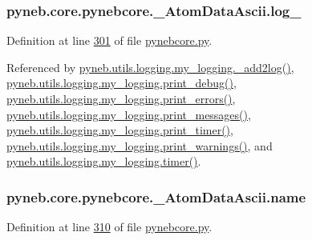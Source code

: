 \hypertarget{classpyneb_1_1core_1_1pynebcore_1_1___atom_data_ascii_aaddba4bcc59a7a5e69c08b2545939737}{}
\subsubsection[{log\+\_\+}]{\setlength{\rightskip}{0pt plus 5cm}pyneb.\+core.\+pynebcore.\+\_\+\+Atom\+Data\+Ascii.\+log\+\_\+}\label{classpyneb_1_1core_1_1pynebcore_1_1___atom_data_ascii_aaddba4bcc59a7a5e69c08b2545939737}


Definition at line \hyperlink{pynebcore_8py_source_l00301}{301} of file \hyperlink{pynebcore_8py_source}{pynebcore.\+py}.



Referenced by \hyperlink{logging_8py_source_l00059}{pyneb.\+utils.\+logging.\+my\+\_\+logging.\+\_\+add2log()}, \hyperlink{logging_8py_source_l00157}{pyneb.\+utils.\+logging.\+my\+\_\+logging.\+print\+\_\+debug()}, \hyperlink{logging_8py_source_l00149}{pyneb.\+utils.\+logging.\+my\+\_\+logging.\+print\+\_\+errors()}, \hyperlink{logging_8py_source_l00133}{pyneb.\+utils.\+logging.\+my\+\_\+logging.\+print\+\_\+messages()}, \hyperlink{logging_8py_source_l00165}{pyneb.\+utils.\+logging.\+my\+\_\+logging.\+print\+\_\+timer()}, \hyperlink{logging_8py_source_l00141}{pyneb.\+utils.\+logging.\+my\+\_\+logging.\+print\+\_\+warnings()}, and \hyperlink{logging_8py_source_l00115}{pyneb.\+utils.\+logging.\+my\+\_\+logging.\+timer()}.

\hypertarget{classpyneb_1_1core_1_1pynebcore_1_1___atom_data_ascii_ab03fcf558862acb02a57ccd5accf155d}{}
\subsubsection[{name}]{\setlength{\rightskip}{0pt plus 5cm}pyneb.\+core.\+pynebcore.\+\_\+\+Atom\+Data\+Ascii.\+name}\label{classpyneb_1_1core_1_1pynebcore_1_1___atom_data_ascii_ab03fcf558862acb02a57ccd5accf155d}


Definition at line \hyperlink{pynebcore_8py_source_l00310}{310} of file \hyperlink{pynebcore_8py_source}{pynebcore.\+py}.

